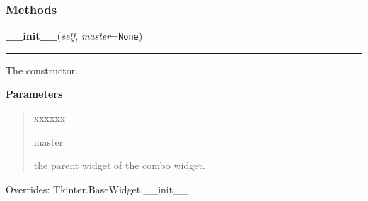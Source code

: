   \subsubsection{Methods}

    \vspace{0.5ex}

\hspace{.8\funcindent}\begin{boxedminipage}{\funcwidth}

    \raggedright \textbf{\_\_init\_\_}(\textit{self}, \textit{master}={\tt None})

    \vspace{-1.5ex}

    \rule{\textwidth}{0.5\fboxrule}
\setlength{\parskip}{2ex}
    The constructor.

\setlength{\parskip}{1ex}
      \textbf{Parameters}
      \vspace{-1ex}

      \begin{quote}
        \begin{Ventry}{xxxxxx}

          \item[master]

          the parent widget of the combo widget.

        \end{Ventry}

      \end{quote}

      Overrides: Tkinter.BaseWidget.\_\_init\_\_

    \end{boxedminipage}

    \label{nMOLDYN:GUI:Widgets:StatusBar:setValue}

    \vspace{0.5ex}


